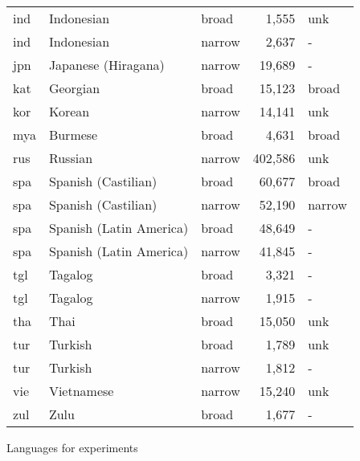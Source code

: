 {\begin{tabularx}{\textwidth}{|Xll >{\raggedright}rl|}
ind                & Indonesian              & broad                  & 1,555                      & unk               \\
ind                & Indonesian              & narrow                 & 2,637                      & -                 \\
jpn                & Japanese (Hiragana)     & narrow                 & 19,689                     & -                 \\
kat                & Georgian                & broad                  & 15,123                     & broad             \\
kor                & Korean                  & narrow                 & 14,141                     & unk               \\
mya                & Burmese                 & broad                  & 4,631                      & broad             \\
rus                & Russian                 & narrow                 & 402,586                    & unk               \\
spa                & Spanish (Castilian)     & broad                  & 60,677                     & broad             \\
spa                & Spanish (Castilian)     & narrow                 & 52,190                     & narrow            \\
spa                & Spanish (Latin America) & broad                  & 48,649                     & -                 \\
spa                & Spanish (Latin America) & narrow                 & 41,845                     & -                 \\
tgl                & Tagalog                 & broad                  & 3,321                      & -                 \\
tgl                & Tagalog                 & narrow                 & 1,915                      & -                 \\
tha                & Thai                    & broad                  & 15,050                     & unk               \\
tur                & Turkish                 & broad                  & 1,789                      & unk               \\
tur                & Turkish                 & narrow                 & 1,812                      & -                 \\
vie                & Vietnamese              & narrow                 & 15,240                     & unk               \\
zul                & Zulu                    & broad                  & 1,677                      & -                 \\ \hline
\end{tabularx}}{Languages for experiments}


